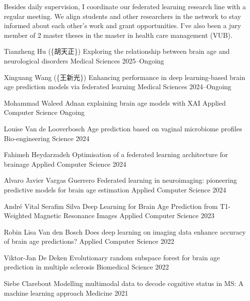 
Besides daily supervision, I coordinate our federated learning research line with a regular meeting.  We align students and other researchers in the network to stay informed about each other's work  and grant opportunities. I've also been a jury member of 2 master theses in the master in health care management (VUB).


\begin{cvmentoring}

  \cvhonor
    {Tianzheng Hu (\cjk\{胡天正\})}
    {Exploring the relationship between brain age and neurological disorders}
    {Medical Sciences}
    {2025--Ongoing \vfill}

  \cvhonor
    {Xinguang Wang (\cjk\{王新光\})}
    {Enhancing performance in deep learning-based brain age prediction models via federated learning}
    {Medical Sciences}
    {2024--Ongoing \vfill}

\end{cvmentoring}

\begin{cvmentoring}

  \cvhonor
    {Mohammad Waleed Adnan}
    {explaining brain age models with XAI}
    {Applied Computer Science}
    {Ongoing \vfill}

  \cvhonor
    {Louise Van de Looverbosch}
    {Age prediction based on vaginal microbiome profiles}
    {Bio-engineering Science}
    {2024 \vfill}

  \cvhonor
    {Fahimeh Heydarzadeh}
    {Optimisation of a federated learning architecture for brainage}
    {Applied Computer Science}
    {2024 \vfill}

  \cvhonor
    {Alvaro Javier Vargas Guerrero}
    {Federated learning in neuroimaging: pioneering predictive models for brain age estimation}
    {Applied Computer Science}
    {2024 \vfill}

  \cvhonor
    {André Vital Serafim Silva}
    {Deep Learning for Brain Age Prediction from T1-Weighted Magnetic Resonance Images}
    {Applied Computer Science}
    {2023 \vfill}

  \cvhonor
    {Robin Lisa Van den Bosch}
    {Does deep learning on imaging data enhance accuracy of brain age predictions?}
    {Applied Computer Science}
    {2022 \vfill}

  \cvhonor
    {Viktor-Jan De Deken}
    {Evolutionary random subspace forest for brain age prediction in multiple sclerosis}
    {Biomedical Science}
    {2022 \vfill}

  \cvhonor
    {Siebe Clarebout}
    {Modelling multimodal data to decode cognitive status in MS: A machine learning approach}
    {Medicine}
    {2021 \vfill}

\end{cvmentoring}